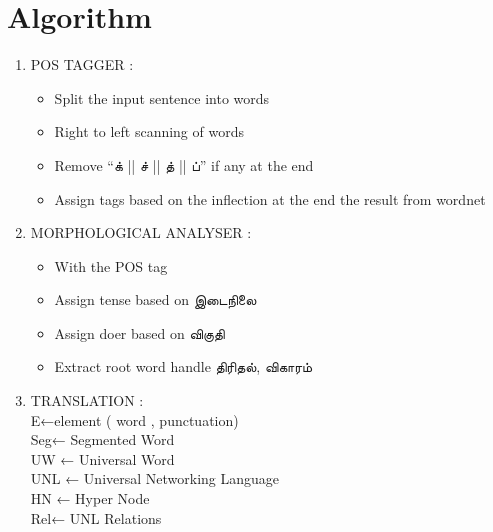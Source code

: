\documentclass{article}
\begin{document}
\section{Algorithm}\large
\begin{enumerate}
\item POS TAGGER :
\begin{itemize}
\item Split the input sentence into words
\item Right to left scanning of words
\item Remove  “\texttamil{க்} || \texttamil{ச்} || \texttamil{த்} || \texttamil{ப்}” if any at the end
\item Assign tags based on the inflection at the end the result from wordnet
\end{itemize}
\item MORPHOLOGICAL ANALYSER :
\begin{itemize}
\item With the POS tag
\item Assign tense based on \texttamil{இடைநிலை}
\item Assign doer based on \texttamil{விகுதி}
\item Extract root word handle \texttamil{திரிதல், விகாரம் }
\end{itemize}
\item TRANSLATION :\\
E←element ( word , punctuation)\\
Seg←  Segmented Word\\
UW ← Universal Word\\
UNL ← Universal Networking Language\\
HN ← Hyper Node\\
Rel← UNL Relations\\
\end{enumerate}
\end{document}
